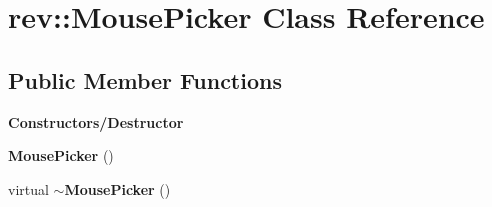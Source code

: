 \hypertarget{classrev_1_1_mouse_picker}{}\section{rev\+::Mouse\+Picker Class Reference}
\label{classrev_1_1_mouse_picker}
\subsection*{Public Member Functions}
\begin{Indent}\textbf{ Constructors/\+Destructor}\par
\begin{DoxyCompactItemize}
\item 
\mbox{\label{classrev_1_1_mouse_picker_aedd6e983c0e82e2cb55f156e8ea2b0fc}} 
{\bfseries Mouse\+Picker} ()
\item 
\mbox{\label{classrev_1_1_mouse_picker_a1cae511caacc78d2d3814183d18cfb25}} 
virtual {\bfseries $\sim$\+Mouse\+Picker} ()
\end{DoxyCompactItemize}
\end{Indent}
